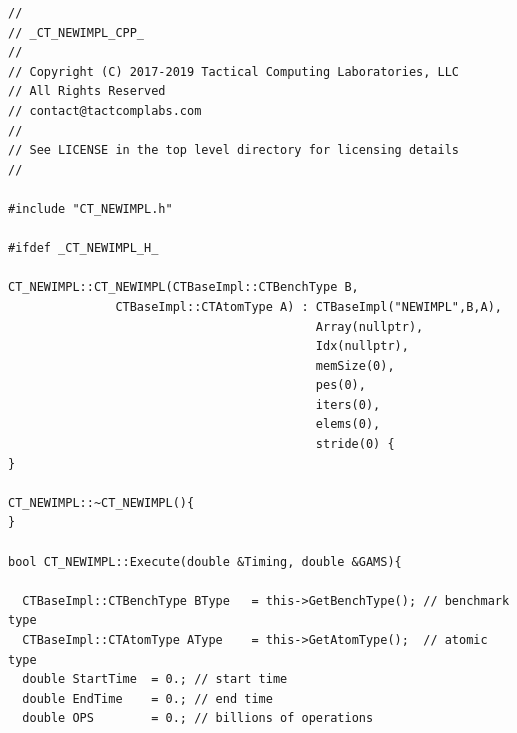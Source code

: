 \documentclass{article}
\begin{document}
\vspace{0.125in}
\begin{lstlisting}[frame=single,style=base,caption={Implementation Overidden Functions},captionpos=b,label={lis:ImplOverFunc}]
//
// _CT_NEWIMPL_CPP_
//
// Copyright (C) 2017-2019 Tactical Computing Laboratories, LLC
// All Rights Reserved
// contact@tactcomplabs.com
//
// See LICENSE in the top level directory for licensing details
//

#include "CT_NEWIMPL.h"

#ifdef _CT_NEWIMPL_H_

CT_NEWIMPL::CT_NEWIMPL(CTBaseImpl::CTBenchType B,
               CTBaseImpl::CTAtomType A) : CTBaseImpl("NEWIMPL",B,A),
                                           Array(nullptr),
                                           Idx(nullptr),
                                           memSize(0),
                                           pes(0),
                                           iters(0),
                                           elems(0),
                                           stride(0) {
}

CT_NEWIMPL::~CT_NEWIMPL(){
}

bool CT_NEWIMPL::Execute(double &Timing, double &GAMS){

  CTBaseImpl::CTBenchType BType   = this->GetBenchType(); // benchmark type
  CTBaseImpl::CTAtomType AType    = this->GetAtomType();  // atomic type
  double StartTime  = 0.; // start time
  double EndTime    = 0.; // end time
  double OPS        = 0.; // billions of operations


\end{lstlisting}
\end{document}
